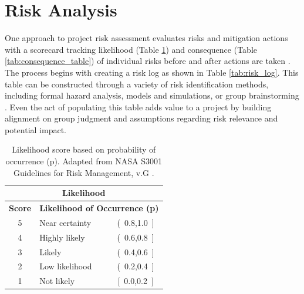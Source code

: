 \section{Risk Analysis}\label{ch7:risk_analysis}
One approach to project risk assessment evaluates risks and mitigation actions with a scorecard tracking likelihood (Table \ref{tab:likelihood_table}) and consequence (Table \ref{tab:consequence_table}) of individual risks before and after actions are taken \citep{malone_development_2004}. The process begins with creating a risk log as shown in Table \ref{tab:risk_log}. This table can be constructed through a variety of risk identification methods, including formal hazard analysis, models and simulations, or group brainstorming \citep{nasa_s3001_2017}. Even the act of populating this table adds value to a project by building alignment on group judgment and assumptions regarding risk relevance and potential impact.

\begin{table}[!htp]
\centering
\begin{tabular}{|c|l|c|}
\hline
\multicolumn{3}{|c|}{\textbf{Likelihood}} \\ \hline
\textbf{Score} & \multicolumn{2}{c|}{\textbf{Likelihood of Occurrence (p)}} \\ \hline
5 & Near certainty & (\ 0.8,1.0\ {]} \\ \hline
4 & Highly likely & (\ 0.6,0.8\ {]} \\ \hline
3 & Likely & (\ 0.4,0.6\ {]} \\ \hline
2 & Low likelihood & (\ 0.2,0.4\ {]} \\ \hline
1 & Not likely & {[}\ 0.0,0.2\ {]} \\ \hline
\end{tabular}
\caption[Risk likelihood]{Likelihood score based on probability of occurrence (p). Adapted from NASA S3001 Guidelines for Risk Management, v.G \protect\citep{malone_development_2004}.}
\label{tab:likelihood_table}
\end{table}

